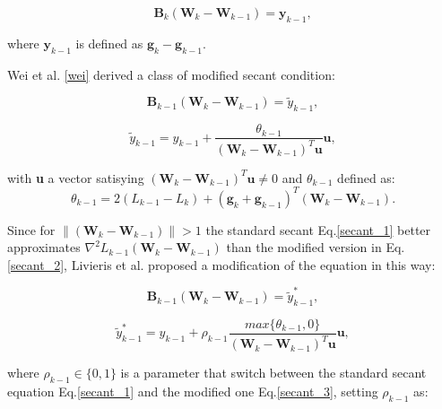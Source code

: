 			\begin{equation}
			\label{secant_1}
 				\textbf{B}_k (\textbf{W}_k - \textbf{W}_{k-1}) = \textbf{y}_{k-1},
 			\end{equation}

 			where $\textbf{y}_{k-1}$ is defined as $\textbf{g}_k - \textbf{g}_{k-1}$.

 			Wei et al. \ref{wei} derived a class of modified secant condition:

			\begin{equation}
			\label{secant_2}
 				\textbf{B}_{k-1} (\textbf{W}_k - \textbf{W}_{k-1}) = \widetilde{y}_{k-1},
 			\end{equation}		


			\begin{equation}
			\label{secant_2}
 			 \widetilde{y}_{k-1} =  y_{k-1} + \frac{\theta_{k-1}}{(\textbf{W}_k - \textbf{W}_{k-1})^T\textbf{u}}\textbf{u},  		
 			\end{equation}	

 			with \textbf{u} a vector satisying $(\textbf{W}_k - \textbf{W}_{k-1})^T\textbf{u} \neq 0$ and $\theta_{k-1}$ defined as:
 			\begin{equation}
			\label{theta}
 			 \theta_{k-1} = 2(\textit{L}_{k-1} - \textit{L}_{k}) + (\textbf{g}_k + \textbf{g}_{k-1})^T(\textbf{W}_k - \textbf{W}_{k-1}).
 			\end{equation}	


 			Since for $\|(\textbf{W}_k - \textbf{W}_{k-1})\| > 1$ the standard secant Eq.\ref{secant_1} better approximates $\nabla^2\textit{L}_{k-1}(\textbf{W}_k - \textbf{W}_{k-1})$ than the modified version in Eq.\ref{secant_2}, Livieris et al. proposed a modification of the equation in this way:

 			\begin{equation}
			\label{secant_3}
 				\textbf{B}_{k-1} (\textbf{W}_k - \textbf{W}_{k-1}) = \widetilde{y}_{k-1}^*,
 			\end{equation}	

 			\begin{equation}
			\label{y_3}
 				\widetilde{y}_{k-1}^* = y_{k-1} + \rho_{k-1} \frac{max\{\theta_{k-1},0\}}{(\textbf{W}_k - \textbf{W}_{k-1})^T\textbf{u}}\textbf{u},
 			\end{equation}

 			where $\rho_{k-1} \in \{0,1\}$ is a parameter that switch between the standard secant equation Eq.\ref{secant_1} and the modified one Eq.\ref{secant_3}, setting $\rho_{k-1}$ as:

